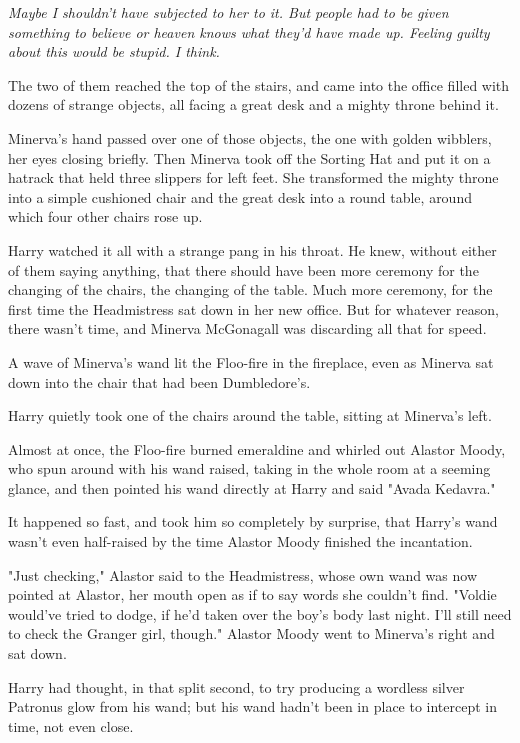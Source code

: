 \emph{Maybe I shouldn't have subjected to her to it. But people had to be
given \emph{something} to believe or heaven knows what they'd have made up.
Feeling guilty about this would be stupid. I think.}

The two of them reached the top of the stairs, and came into the office filled
with dozens of strange objects, all facing a great desk and a mighty throne
behind it.

Minerva's hand passed over one of those objects, the one with golden wibblers,
her eyes closing briefly. Then Minerva took off the Sorting Hat and put it on a
hatrack that held three slippers for left feet. She transformed the mighty
throne into a simple cushioned chair and the great desk into a round table,
around which four other chairs rose up.

Harry watched it all with a strange pang in his throat. He knew, without either
of them saying anything, that there should have been more ceremony for the
changing of the chairs, the changing of the table. Much more ceremony, for the
first time the Headmistress sat down in her new office. But for whatever
reason, there wasn't time, and Minerva McGonagall was discarding all that for
speed.

A wave of Minerva's wand lit the Floo-fire in the fireplace, even as Minerva
sat down into the chair that had been Dumbledore's.

Harry quietly took one of the chairs around the table, sitting at Minerva's
left.

Almost at once, the Floo-fire burned emeraldine and whirled out Alastor Moody,
who spun around with his wand raised, taking in the whole room at a seeming
glance, and then pointed his wand directly at Harry and said "Avada Kedavra."

It happened so fast, and took him so completely by surprise, that Harry's wand
wasn't even half-raised by the time Alastor Moody finished the incantation.

"Just checking," Alastor said to the Headmistress, whose own wand was now
pointed at Alastor, her mouth open as if to say words she couldn't find.
"Voldie would've tried to dodge, if he'd taken over the boy's body last night.
I'll still need to check the Granger girl, though." Alastor Moody went to
Minerva's right and sat down.

Harry had thought, in that split second, to try producing a wordless silver
Patronus glow from his wand; but his wand hadn't been in place to intercept in
time, not even close.

